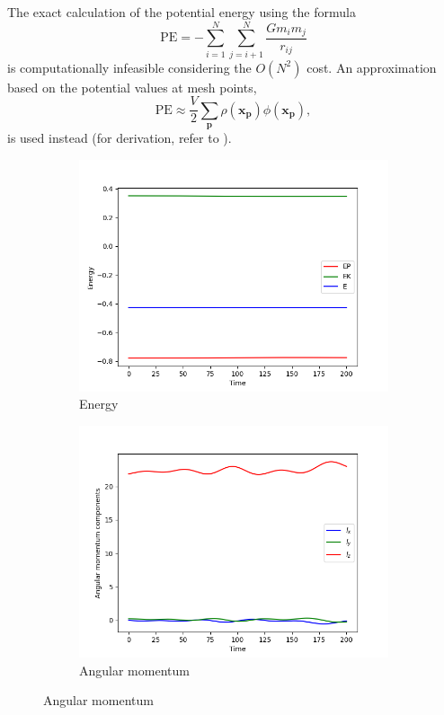 The exact calculation of the potential energy \cite{taylor2005classical} using the formula
\begin{equation*}
    \textrm{PE} = -\sum_{i=1}^{N}\sum_{j=i+1}^{N}\frac{G m_i m_j}{r_{ij}}
\end{equation*}
is computationally infeasible considering the $O(N^2)$ cost.
An approximation based on the potential values at mesh points,
\begin{equation*}
    \textrm{PE} \approx \frac{V}{2}\sum_{\mathbf{p}} \rho(\mathbf{x}_\mathbf{p})\phi(\mathbf{x}_\mathbf{p}),
\end{equation*}
is used instead (for derivation, refer to \cite{Hockney1988}).
\begin{figure}[!ht]
    \centering
    \begin{subfigure}[b]{0.45\textwidth}
        \centering
        \includegraphics[width=\textwidth]{chapters/results/img/pm-galaxy/energy.png}
        \caption{Energy}
        \label{fig:physical-quantities-pm-sub1}
    \end{subfigure}
    \hfill
    \begin{subfigure}[b]{0.45\textwidth}
        \centering
        \includegraphics[width=\textwidth]{chapters/results/img/pm-galaxy/angular-momentum.png}
        \caption{Angular momentum}
        \label{fig:physical-quantities-pm-sub2}
    \end{subfigure}


\end{figure}
